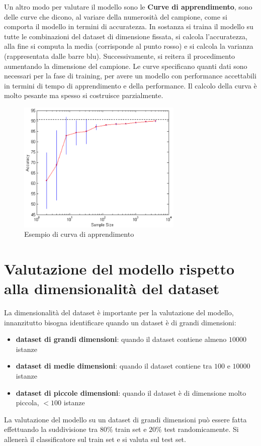 Un altro modo per valutare il modello sono le \textbf{Curve di apprendimento},
sono delle curve che dicono, al variare della numerosità del campione, come si
comporta il modello in termini di accuratezza. In sostanza si traina il modello
su tutte le combinazioni del dataset di dimensione fissata, si calcola l'accuratezza,
alla fine si computa la media (corrisponde al punto rosso) e si calcola la varianza
(rappresentata dalle barre blu). Successivamente, si reitera il procedimento aumentando
la dimensione del campione. Le curve specificano quanti dati sono necessari per
la fase di training, per avere un modello con performance accettabili in termini
di tempo di apprendimento e della performance. Il calcolo della curva è molto
pesante ma spesso si costruisce parzialmente.
\begin{figure}[!ht]
    \centering
    \includegraphics[width=0.7\textwidth]{img/performance evaluation/curva-di-apprendimento.png}
    \caption{Esempio di curva di apprendimento}
    \label{fig:curva-di-apprendimento}
\end{figure}
\section{Valutazione del modello rispetto alla dimensionalità del dataset}
La dimensionalità del dataset è importante per la valutazione del modello, innanzitutto
bisogna identificare quando un dataset è di grandi dimensioni:
\begin{itemize}
    \item \textbf{dataset di grandi dimensioni}: quando il dataset contiene almeno
          $10000$ istanze
    \item \textbf{dataset di medie dimensioni}: quando il dataset contiene tra
          $100$ e $10000$ istanze
    \item \textbf{dataset di piccole dimensioni}: quando il dataset è di dimensione
          molto piccola, $<100$ istanze
\end{itemize}
La valutazione del modello su un dataset di grandi dimensioni può essere fatta
effettuando la suddivisione tra  $80\%$ train set e $20\%$ test randomicamente.
Si allenerà il classificatore sul train set e si valuta sul test set.

